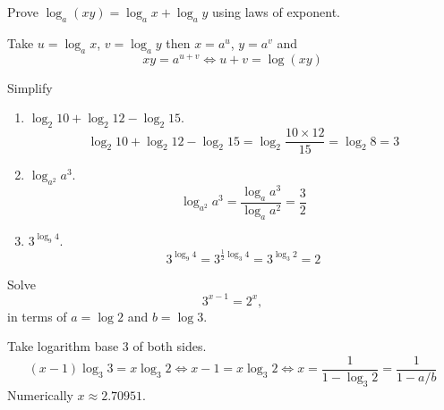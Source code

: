 \documentclass[calc1-main.tex]{subfiles}
\begin{document}
  \begin{example}
    Prove $\log_a (x y) = \log_a x + \log_a y$ using laws of exponent.
  \end{example}
  \begin{solution}
    Take $u = \log_a x$, $v = \log_a y$ then $x = a^u$, $y = a^v$ and
    \[
      x y = a^{u+v} \iff u + v = \log(xy)
    \]
  \end{solution}

  \begin{example}
    Simplify
    \begin{enumerate}
      \item $\log_2 10 + \log_2 12 - \log_2 15$.
      \[
        \log_2 10 + \log_2 12 - \log_2 15
        = \log_2 \frac{10 \times 12}{15} = \log_2 8 = 3
      \]
      \item $\log_{a^2} a^3$.
      \[
       \log_{a^2} a^3
       = \frac{\log_a a^3}{\log_a a^2} = \frac{3}{2}
     \]
     \item $3^{\log_9 4}$.
     \[
      3^{\log_9 4}
      = 3^{\frac{1}{2} \log_3 4} = 3^{\log_3 2} = 2
    \]
  \end{enumerate}
\end{example}

\begin{example}
  Solve
  \[
    3^{x-1} = 2^x,
  \]
  in terms of $a=\log 2$ and $b=\log 3$.
\end{example}
\begin{solution}
  Take logarithm base 3 of both sides.
  \[
    (x-1) \log_{3} 3 = x \log_{3} 2 \iff
    x-1 = x \log_3 2 \iff
    x = \frac{1}{1- \log_3 2} = \frac{1}{1-a/b}
  \]
  Numerically $x \approx 2.70951$.
\end{solution}
\end{document}
